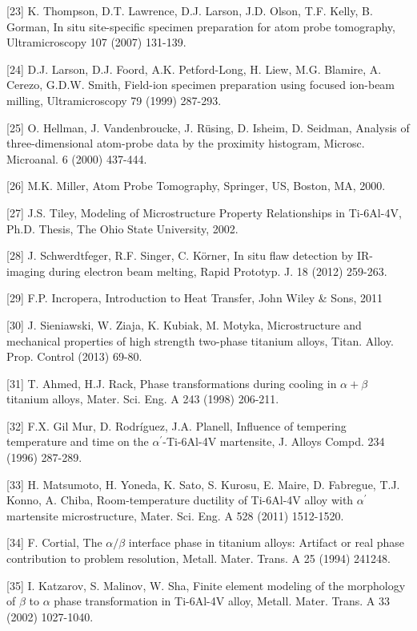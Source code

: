\documentclass[10pt]{article}
\begin{document}
[23] K. Thompson, D.T. Lawrence, D.J. Larson, J.D. Olson, T.F. Kelly, B. Gorman, In situ site-specific specimen preparation for atom probe tomography, Ultramicroscopy 107 (2007) 131-139.

[24] D.J. Larson, D.J. Foord, A.K. Petford-Long, H. Liew, M.G. Blamire, A. Cerezo, G.D.W. Smith, Field-ion specimen preparation using focused ion-beam milling, Ultramicroscopy 79 (1999) 287-293.

[25] O. Hellman, J. Vandenbroucke, J. Rüsing, D. Isheim, D. Seidman, Analysis of three-dimensional atom-probe data by the proximity histogram, Microsc. Microanal. 6 (2000) 437-444.

[26] M.K. Miller, Atom Probe Tomography, Springer, US, Boston, MA, 2000.

[27] J.S. Tiley, Modeling of Microstructure Property Relationships in Ti-6Al-4V, Ph.D. Thesis, The Ohio State University, 2002.

[28] J. Schwerdtfeger, R.F. Singer, C. Körner, In situ flaw detection by IR-imaging during electron beam melting, Rapid Prototyp. J. 18 (2012) 259-263.

[29] F.P. Incropera, Introduction to Heat Transfer, John Wiley \& Sons, 2011

[30] J. Sieniawski, W. Ziaja, K. Kubiak, M. Motyka, Microstructure and mechanical properties of high strength two-phase titanium alloys, Titan. Alloy. Prop. Control (2013) 69-80.

[31] T. Ahmed, H.J. Rack, Phase transformations during cooling in $\alpha+\beta$ titanium alloys, Mater. Sci. Eng. A 243 (1998) 206-211.

[32] F.X. Gil Mur, D. Rodríguez, J.A. Planell, Influence of tempering temperature and time on the $\alpha^{\prime}$-Ti-6Al-4V martensite, J. Alloys Compd. 234 (1996) 287-289.

[33] H. Matsumoto, H. Yoneda, K. Sato, S. Kurosu, E. Maire, D. Fabregue, T.J. Konno, A. Chiba, Room-temperature ductility of Ti-6Al-4V alloy with $\alpha^{\prime}$ martensite microstructure, Mater. Sci. Eng. A 528 (2011) 1512-1520.

[34] F. Cortial, The $\alpha / \beta$ interface phase in titanium alloys: Artifact or real phase contribution to problem resolution, Metall. Mater. Trans. A 25 (1994) 241248.

[35] I. Katzarov, S. Malinov, W. Sha, Finite element modeling of the morphology of $\beta$ to $\alpha$ phase transformation in Ti-6Al-4V alloy, Metall. Mater. Trans. A 33 (2002) 1027-1040.
\end{document}
